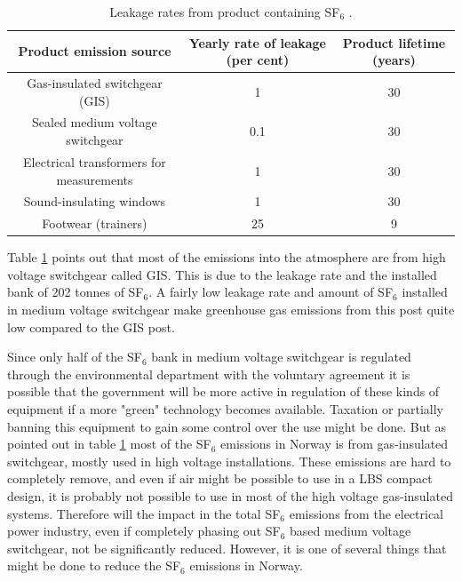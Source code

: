 \documentclass[10pt,a4paper,twoside]{article}
\begin{document}
\begin{table}[H]
\center
\caption{Leakage rates from product containing SF$_6$ \cite{bib:StatSF6}.}
\begin{tabular}{|c|c|c|}
\hline 
\textbf{Product emission source}
 & \textbf{Yearly rate of
leakage (per cent)}
 & \textbf{Product lifetime
(years)}
 \\ 
\hline 
Gas-insulated switchgear (GIS)
 & 1 & 30 \\ 
\hline 
Sealed medium voltage switchgear
 & 0.1 & 30 \\ 
\hline 
Electrical transformers for
measurements
 & 1 & 30 \\ 
\hline 
Sound-insulating windows
 & 1 & 30 \\ 
\hline 
Footwear (trainers)
 & 25 & 9 \\ 
\hline 
\end{tabular} 
\label{tab:leakageRatesProdSF6}
\end{table}

Table \ref{tab:leakageRatesProdSF6} points out that most of the emissions into the atmosphere are from high voltage switchgear called GIS. This is due to the leakage rate and the installed bank of 202 tonnes of SF$_6$. A fairly low leakage rate and amount of SF$_6$ installed in medium voltage switchgear make greenhouse gas emissions from this post quite low compared to the GIS post.

Since only half of the SF$_6$ bank in medium voltage switchgear is regulated through the environmental department with the voluntary agreement it is possible that the government will be more active in regulation of these kinds of equipment if a more "green" technology becomes available. Taxation or partially banning this equipment to gain some control over the use might be done. But as pointed out in table \ref{tab:leakageRatesProdSF6} most of the SF$_6$ emissions in Norway is from gas-insulated switchgear, mostly used in high voltage installations. These emissions are hard to completely remove, and even if air might be possible to use in a LBS compact design, it is probably not possible to use in most of the high voltage gas-insulated systems. Therefore will the impact in the total SF$_6$ emissions from the electrical power industry, even if completely phasing out SF$_6$ based medium voltage switchgear, not be significantly reduced. However, it is one of several things that might be done to reduce the SF$_6$ emissions in Norway.
\end{document}
